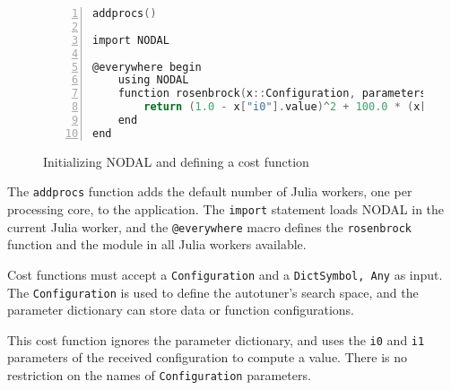 \begin{figure}[htpb]
    \begin{minipage}{\linewidth}
    \begin{lstlisting}[language=C, basicstyle=\ttfamily\scriptsize,
        numbers=left,
        frame=no, showspaces=false, showstringspaces=false,
        numberstyle=\scriptsize,
        xleftmargin=1.5cm,
        keywords={%
            @spawnat, remotecall, Nullable, Any,
            @fetch, Future, Array, Float64, julia,
            while, true, function, end, put!,
            take!, sleep, RemoteChannel, Channel,
            Int, Tuple, const, addprocs, @schedule,
            @everywhere, for, in, myid, @async,
            remote_do, workers, Result, Real,
            AbstractFloat, deepcopy, rand, exp, true,
            Function, false, Run, mutable, struct,
            begin, Configuration, Dict, Symbol, using, import,
            ResultChannel, AbstractChannel, return%
        },
        otherkeywords={::, \&, \*, +, -, /, [, ], >, <, put!, take!, neighbor!,
                       update!}
    ]
addprocs()

import NODAL

@everywhere begin
    using NODAL
    function rosenbrock(x::Configuration, parameters::Dict{Symbol, Any})
        return (1.0 - x["i0"].value)^2 + 100.0 * (x["i1"].value - x["i0"].value^2)^2
    end
end
    \end{lstlisting}
    \end{minipage}
    \caption{Initializing NODAL and defining a cost function}
    \label{fig:nodal-cost}
\end{figure}

The \texttt{addprocs} function adds the default number of Julia workers, one
per processing core, to the application. The \texttt{import} statement loads
NODAL in the current Julia worker, and the \texttt{@everywhere} macro defines
the \texttt{rosenbrock} function and the module in all Julia workers available.

Cost functions must accept a \texttt{Configuration} and a \texttt{Dict{Symbol,
Any}} as input. The \texttt{Configuration} is used to define the autotuner's
search space, and the parameter dictionary can store data or function
configurations.

This cost function ignores the parameter dictionary, and uses the \texttt{i0}
and \texttt{i1} parameters of the received configuration to compute a value.
There is no restriction on the names of \texttt{Configuration} parameters.

